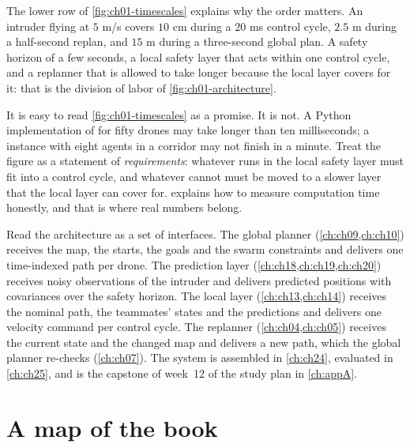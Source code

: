 The lower row of \cref{fig:ch01-timescales} explains why the order matters. An intruder
flying at $5$ m/s covers $10$ cm during a $20$ ms control cycle, $2.5$ m during a
half-second replan, and $15$ m during a three-second global plan. A safety horizon of
a few seconds, a local safety layer that acts within one control cycle, and a replanner
that is allowed to take longer because the local layer covers for it: that is the
division of labor of \cref{fig:ch01-architecture}.

\begin{pitfall}
It is easy to read \cref{fig:ch01-timescales} as a promise. It is not. A Python
implementation of \orca for fifty drones may take longer than ten milliseconds; a
\cbs instance with eight agents in a corridor may not finish in a minute. Treat the
figure as a statement of \emph{requirements}: whatever runs in the local safety layer
must fit into a control cycle, and whatever cannot must be moved to a slower layer that
the local layer can cover for.  explains how to measure computation time
honestly, and that is where real numbers belong.
\end{pitfall}

\begin{dronebox}
Read the architecture as a set of interfaces. The global planner
(\cref{ch:ch09,ch:ch10}) receives the map, the starts, the goals and the swarm
constraints and delivers one time-indexed path per drone. The prediction layer
(\cref{ch:ch18,ch:ch19,ch:ch20}) receives noisy observations of the intruder and
delivers predicted positions with covariances over the safety horizon. The local
layer (\cref{ch:ch13,ch:ch14}) receives the nominal path, the teammates' states and
the predictions and delivers one velocity command per control cycle. The replanner
(\cref{ch:ch04,ch:ch05}) receives the current state and the changed map and delivers
a new path, which the global planner re-checks (\cref{ch:ch07}). The system is
assembled in \cref{ch:ch24}, evaluated in \cref{ch:ch25}, and is the capstone of
week~12 of the study plan in \cref{ch:appA}.
\end{dronebox}

\section{A map of the book}
\label{sec:ch01-map}

